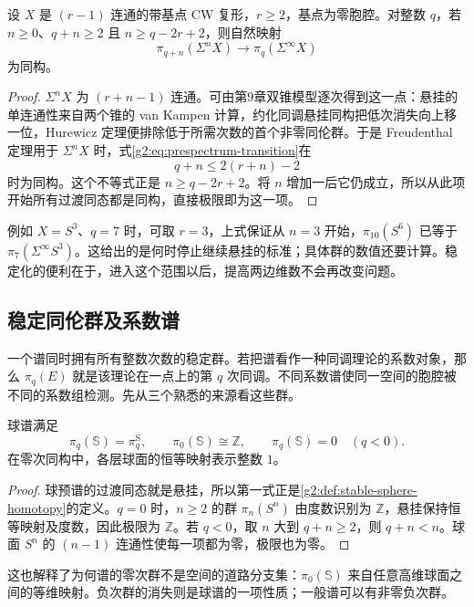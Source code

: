 \begin{proposition}\label{g2:prop:suspension-spectrum-stable-range}
	设 \(X\) 是 \((r-1)\) 连通的带基点 CW 复形，\(r\ge2\)，基点为零胞腔。对整数 \(q\)，若 \(n\ge0\)、\(q+n\ge2\) 且 \(n\ge q-2r+2\)，则自然映射
	\[
		\pi_{q+n}(\Sigma^nX)\longrightarrow\pi_q(\Sigma^\infty X)
	\]
	为同构。
\end{proposition}
\begin{proof}
	\(\Sigma^nX\) 为 \((r+n-1)\) 连通。可由第9章双锥模型逐次得到这一点：悬挂的单连通性来自两个锥的 van Kampen 计算，约化同调悬挂同构把低次消失向上移一位，Hurewicz 定理便排除低于所需次数的首个非零同伦群。于是 Freudenthal 定理用于 \(\Sigma^nX\) 时，式\eqref{g2:eq:prespectrum-transition}在
	\[
		q+n\le2(r+n)-2
	\]
	时为同构。这个不等式正是 \(n\ge q-2r+2\)。将 \(n\) 增加一后它仍成立，所以从此项开始所有过渡同态都是同构，直接极限即为这一项。
\end{proof}

例如 \(X=S^3\)、\(q=7\) 时，可取 \(r=3\)，上式保证从 \(n=3\) 开始，\(\pi_{10}(S^6)\) 已等于 \(\pi_7(\Sigma^\infty S^3)\)。这给出的是何时停止继续悬挂的标准；具体群的数值还要计算。稳定化的便利在于，进入这个范围以后，提高两边维数不会再改变问题。

\subsection{稳定同伦群及系数谱}
\label{g2:subsec:C02:02}

一个谱同时拥有所有整数次数的稳定群。若把谱看作一种同调理论的系数对象，那么 \(\pi_q(E)\) 就是该理论在一点上的第 \(q\) 次同调。不同系数谱使同一空间的胞腔被不同的系数组检测。先从三个熟悉的来源看这些群。

\begin{proposition}\label{g2:prop:sphere-spectrum-low-coefficients}
	球谱满足
	\[
		\pi_q(\mathbb S)=\pi_q^{\mathrm S},\qquad
		\pi_0(\mathbb S)\cong\mathbb Z,\qquad
		\pi_q(\mathbb S)=0\quad(q<0).
	\]
	在零次同构中，各层球面的恒等映射表示整数 \(1\)。
\end{proposition}
\begin{proof}
	球预谱的过渡同态就是悬挂，所以第一式正是\cref{g2:def:stable-sphere-homotopy}的定义。\(q=0\) 时，\(n\ge2\) 的群 \(\pi_n(S^n)\) 由度数识别为 \(\mathbb Z\)，悬挂保持恒等映射及度数，因此极限为 \(\mathbb Z\)。若 \(q<0\)，取 \(n\) 大到 \(q+n\ge2\)，则 \(q+n<n\)。球面 \(S^n\) 的 \((n-1)\) 连通性使每一项都为零，极限也为零。
\end{proof}

这也解释了为何谱的零次群不是空间的道路分支集：\(\pi_0(\mathbb S)\) 来自任意高维球面之间的等维映射。负次群的消失则是球谱的一项性质；一般谱可以有非零负次群。


